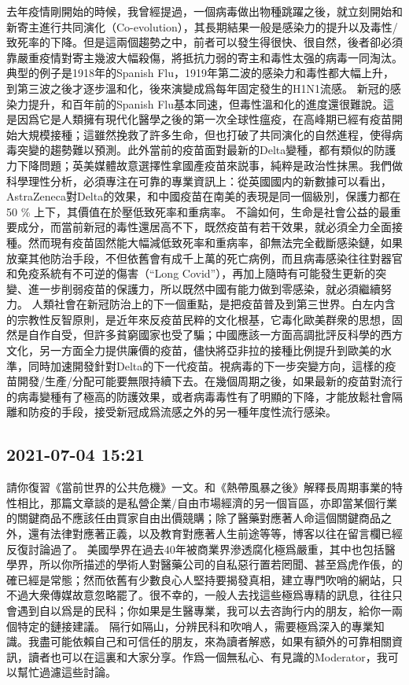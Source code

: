 \documentclass[twocolumn]{ctexart}
\begin{document}
去年疫情剛開始的時候，我曾經提過，一個病毒做出物種跳躍之後，就立刻開始和新寄主進行共同演化（Co-evolution），其長期結果一般是感染力的提升以及毒性/致死率的下降。但是這兩個趨勢之中，前者可以發生得很快、很自然，後者卻必須靠嚴重疫情對寄主幾波大幅殺傷，將抵抗力弱的寄主和毒性太强的病毒一同淘汰。典型的例子是1918年的Spanish Flu，1919年第二波的感染力和毒性都大幅上升，到第三波之後才逐步溫和化，後來演變成爲每年固定發生的H1N1流感。
新冠的感染力提升，和百年前的Spanish Flu基本同速，但毒性溫和化的進度還很難說。這是因爲它是人類擁有現代化醫學之後的第一次全球性瘟疫，在高峰期已經有疫苗開始大規模接種；這雖然挽救了許多生命，但也打破了共同演化的自然進程，使得病毒突變的趨勢難以預測。此外當前的疫苗面對最新的Delta變種，都有類似的防護力下降問題；英美媒體故意選擇性拿國產疫苗來説事，純粹是政治性抹黑。我們做科學理性分析，必須專注在可靠的專業資訊上：從英國國内的新數據可以看出，AstraZeneca對Delta的效果，和中國疫苗在南美的表現是同一個級別，保護力都在50 \% 上下，其價值在於壓低致死率和重病率。
不論如何，生命是社會公益的最重要成分，而當前新冠的毒性還居高不下，既然疫苗有若干效果，就必須全力全面接種。然而現有疫苗固然能大幅減低致死率和重病率，卻無法完全截斷感染鏈，如果放棄其他防治手段，不但依舊會有成千上萬的死亡病例，而且病毒感染往往對器官和免疫系統有不可逆的傷害（“Long Covid”），再加上隨時有可能發生更新的突變、進一步削弱疫苗的保護力，所以既然中國有能力做到零感染，就必須繼續努力。
人類社會在新冠防治上的下一個重點，是把疫苗普及到第三世界。白左内含的宗教性反智原則，是近年來反疫苗民粹的文化根基，它毒化歐美群衆的思想，固然是自作自受，但許多貧窮國家也受了騙；中國應該一方面高調批評反科學的西方文化，另一方面全力提供廉價的疫苗，儘快將亞非拉的接種比例提升到歐美的水準，同時加速開發針對Delta的下一代疫苗。視病毒的下一步突變方向，這樣的疫苗開發/生產/分配可能要無限持續下去。在幾個周期之後，如果最新的疫苗對流行的病毒變種有了極高的防護效果，或者病毒毒性有了明顯的下降，才能放鬆社會隔離和防疫的手段，接受新冠成爲流感之外的另一種年度性流行感染。
\subsection*{2021-07-04 15:21}

請你復習《當前世界的公共危機》一文。和《熱帶風暴之後》解釋長周期事業的特性相比，那篇文章談的是私營企業/自由市場經濟的另一個盲區，亦即當某個行業的關鍵商品不應該任由買家自由出價競購；除了醫藥對應著人命這個關鍵商品之外，還有法律對應著正義，以及教育對應著人生前途等等，博客以往在留言欄已經反復討論過了。
美國學界在過去40年被商業界滲透腐化極爲嚴重，其中也包括醫學界，所以你所描述的學術人對醫藥公司的自私惡行置若罔聞、甚至爲虎作倀，的確已經是常態；然而依舊有少數良心人堅持要揭發真相，建立專門吹哨的網站，只不過大衆傳媒故意忽略罷了。很不幸的，一般人去找這些極爲專精的訊息，往往只會遇到自以爲是的民科；你如果是生醫專業，我可以去咨詢行内的朋友，給你一兩個特定的鏈接建議。
隔行如隔山，分辨民科和吹哨人，需要極爲深入的專業知識。我盡可能依賴自己和可信任的朋友，來為讀者解惑，如果有額外的可靠相關資訊，讀者也可以在這裏和大家分享。作爲一個無私心、有見識的Moderator，我可以幫忙過濾這些討論。
\end{document}
